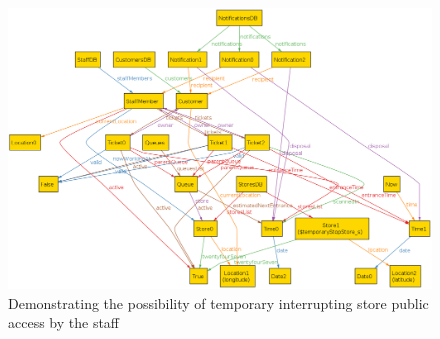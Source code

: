 \begin{figure} [H]
	\includegraphics[width=\linewidth]{../Alloy/temporaryStopStore.png}
	\caption{Demonstrating the possibility of temporary interrupting store public access by the staff}
	\label{fig:temporaryStopStore}
\end{figure}

